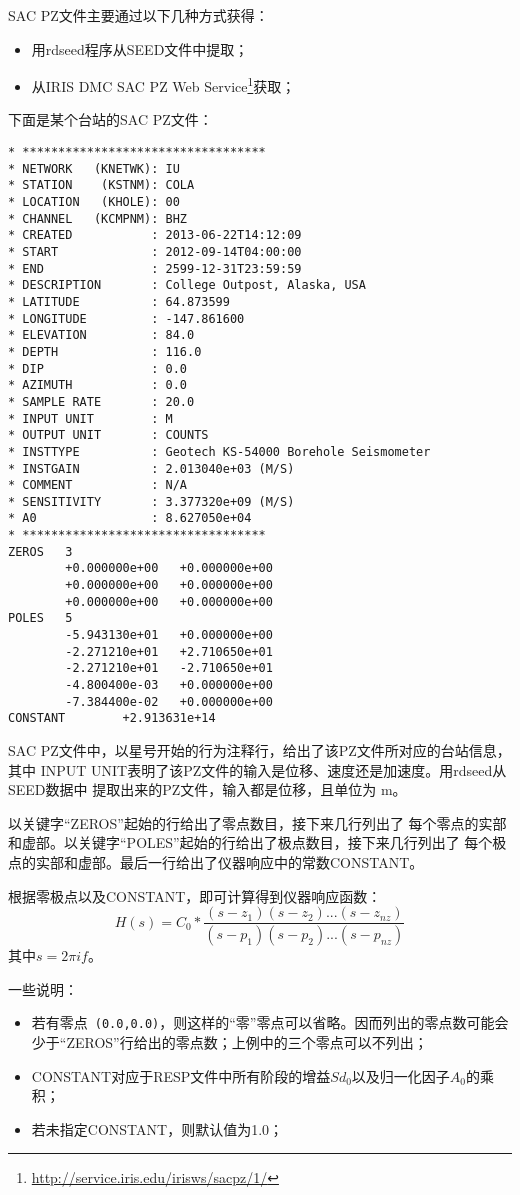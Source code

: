 SAC PZ文件主要通过以下几种方式获得：
\begin{itemize}
\item 用rdseed程序从SEED文件中提取；
\item 从IRIS DMC SAC PZ Web Service\footnote{\url{http://service.iris.edu/irisws/sacpz/1/}}获取；
\end{itemize}

下面是某个台站的SAC PZ文件：
\begin{verbatim}
* **********************************
* NETWORK   (KNETWK): IU
* STATION    (KSTNM): COLA
* LOCATION   (KHOLE): 00
* CHANNEL   (KCMPNM): BHZ
* CREATED           : 2013-06-22T14:12:09
* START             : 2012-09-14T04:00:00
* END               : 2599-12-31T23:59:59
* DESCRIPTION       : College Outpost, Alaska, USA
* LATITUDE          : 64.873599
* LONGITUDE         : -147.861600
* ELEVATION         : 84.0
* DEPTH             : 116.0
* DIP               : 0.0
* AZIMUTH           : 0.0
* SAMPLE RATE       : 20.0
* INPUT UNIT        : M
* OUTPUT UNIT       : COUNTS
* INSTTYPE          : Geotech KS-54000 Borehole Seismometer
* INSTGAIN          : 2.013040e+03 (M/S)
* COMMENT           : N/A
* SENSITIVITY       : 3.377320e+09 (M/S)
* A0                : 8.627050e+04
* **********************************
ZEROS   3
        +0.000000e+00   +0.000000e+00
        +0.000000e+00   +0.000000e+00
        +0.000000e+00   +0.000000e+00
POLES   5
        -5.943130e+01   +0.000000e+00
        -2.271210e+01   +2.710650e+01
        -2.271210e+01   -2.710650e+01
        -4.800400e-03   +0.000000e+00
        -7.384400e-02   +0.000000e+00
CONSTANT        +2.913631e+14
\end{verbatim}

SAC PZ文件中，以星号开始的行为注释行，给出了该PZ文件所对应的台站信息，其中
INPUT UNIT表明了该PZ文件的输入是位移、速度还是加速度。用rdseed从SEED数据中
提取出来的PZ文件，输入都是位移，且单位为 \si{\m}。

以关键字``ZEROS''起始的行给出了零点数目，接下来几行列出了
每个零点的实部和虚部。以关键字``POLES''起始的行给出了极点数目，接下来几行列出了
每个极点的实部和虚部。最后一行给出了仪器响应中的常数CONSTANT。

根据零极点以及CONSTANT，即可计算得到仪器响应函数：
\[
    H(s) = C_0 * \frac{(s-z_1)(s-z_2)...(s-z_{nz})}{(s-p_1)(s-p_2)...(s-p_{nz})}
\]
其中$s=2\pi i f$。

一些说明：
\begin{itemize}
\item 若有零点~\verb+(0.0,0.0)+，则这样的``零''零点可以省略。因而列出的零点数可能会少于``ZEROS''行给出的零点数；上例中的三个零点可以不列出；
\item CONSTANT对应于RESP文件中所有阶段的增益$Sd_0$以及归一化因子$A_0$的乘积；
\item 若未指定CONSTANT，则默认值为1.0；
\end{itemize}

